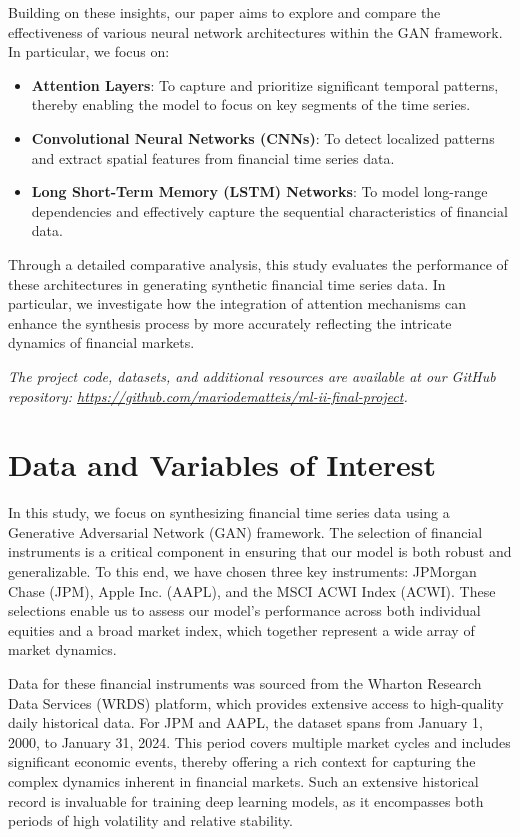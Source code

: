 \documentclass{article}
\begin{document}
Building on these insights, our paper aims to explore and compare the effectiveness of various neural network architectures within the GAN framework. In particular, we focus on:
\begin{itemize}
    \item \textbf{Attention Layers}: To capture and prioritize significant temporal patterns, thereby enabling the model to focus on key segments of the time series.
    \item \textbf{Convolutional Neural Networks (CNNs)}: To detect localized patterns and extract spatial features from financial time series data.
    \item \textbf{Long Short-Term Memory (LSTM) Networks}: To model long-range dependencies and effectively capture the sequential characteristics of financial data.
\end{itemize}

Through a detailed comparative analysis, this study evaluates the performance of these architectures in generating synthetic financial time series data. In particular, we investigate how the integration of attention mechanisms can enhance the synthesis process by more accurately reflecting the intricate dynamics of financial markets.

\vspace{1em}
\noindent\textit{The project code, datasets, and additional resources are available at our GitHub repository: \url{https://github.com/mariodematteis/ml-ii-final-project}.}

\section{Data and Variables of Interest}

In this study, we focus on synthesizing financial time series data using a Generative Adversarial Network (GAN) framework. The selection of financial instruments is a critical component in ensuring that our model is both robust and generalizable. To this end, we have chosen three key instruments: JPMorgan Chase (JPM), Apple Inc. (AAPL), and the MSCI ACWI Index (ACWI). These selections enable us to assess our model's performance across both individual equities and a broad market index, which together represent a wide array of market dynamics.

Data for these financial instruments was sourced from the Wharton Research Data Services (WRDS) platform, which provides extensive access to high-quality daily historical data. For JPM and AAPL, the dataset spans from January 1, 2000, to January 31, 2024. This period covers multiple market cycles and includes significant economic events, thereby offering a rich context for capturing the complex dynamics inherent in financial markets. Such an extensive historical record is invaluable for training deep learning models, as it encompasses both periods of high volatility and relative stability.
\end{document}
